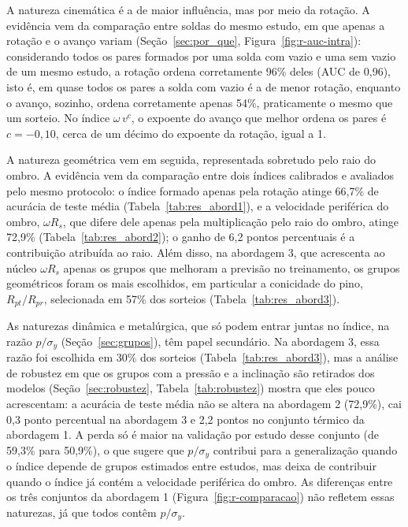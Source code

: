 \documentclass[12pt,openany]{report}
\begin{document}
A natureza cinemática é a de maior influência, mas por meio da rotação. A evidência vem da comparação entre soldas do mesmo estudo, em que apenas a rotação e o avanço variam (Seção~\ref{sec:por_que}, Figura~\ref{fig:r-auc-intra}): considerando todos os pares formados por uma solda com vazio e uma sem vazio de um mesmo estudo, a rotação ordena corretamente 96\% deles (AUC de 0,96), isto é, em quase todos os pares a solda com vazio é a de menor rotação, enquanto o avanço, sozinho, ordena corretamente apenas 54\%, praticamente o mesmo que um sorteio. No índice $\omega\,v^{c}$, o expoente do avanço que melhor ordena os pares é $c = -0{,}10$, cerca de um décimo do expoente da rotação, igual a 1.

A natureza geométrica vem em seguida, representada sobretudo pelo raio do ombro. A evidência vem da comparação entre dois índices calibrados e avaliados pelo mesmo protocolo: o índice formado apenas pela rotação atinge 66,7\% de acurácia de teste média (Tabela~\ref{tab:res_abord1}), e a velocidade periférica do ombro, $\omega R_s$, que difere dele apenas pela multiplicação pelo raio do ombro, atinge 72,9\% (Tabela~\ref{tab:res_abord2}); o ganho de 6,2 pontos percentuais é a contribuição atribuída ao raio. Além disso, na abordagem 3, que acrescenta ao núcleo $\omega R_s$ apenas os grupos que melhoram a previsão no treinamento, os grupos geométricos foram os mais escolhidos, em particular a conicidade do pino, $R_{pt}/R_{pr}$, selecionada em 57\% dos sorteios (Tabela~\ref{tab:res_abord3}).

As naturezas dinâmica e metalúrgica, que só podem entrar juntas no índice, na razão $p/\sigma_y$ (Seção~\ref{sec:grupos}), têm papel secundário. Na abordagem 3, essa razão foi escolhida em 30\% dos sorteios (Tabela~\ref{tab:res_abord3}), mas a análise de robustez em que os grupos com a pressão e a inclinação são retirados dos modelos (Seção~\ref{sec:robustez}, Tabela~\ref{tab:robustez}) mostra que eles pouco acrescentam: a acurácia de teste média não se altera na abordagem 2 (72,9\%), cai 0,3 ponto percentual na abordagem 3 e 2,2 pontos no conjunto térmico da abordagem 1. A perda só é maior na validação por estudo desse conjunto (de 59,3\% para 50,9\%), o que sugere que $p/\sigma_y$ contribui para a generalização quando o índice depende de grupos estimados entre estudos, mas deixa de contribuir quando o índice já contém a velocidade periférica do ombro. As diferenças entre os três conjuntos da abordagem 1 (Figura~\ref{fig:r-comparacao}) não refletem essas naturezas, já que todos contêm $p/\sigma_y$.
\end{document}
